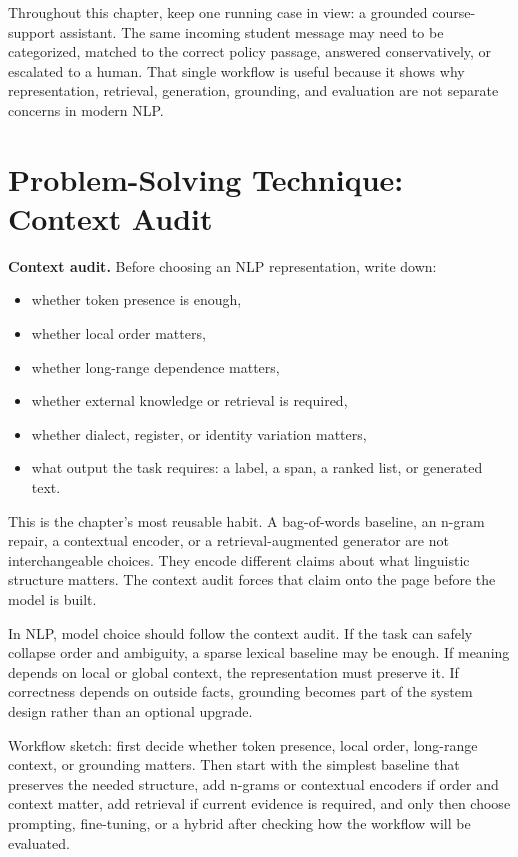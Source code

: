 Throughout this chapter, keep one running case in view: a grounded course-support assistant. The same incoming student message may need to be categorized, matched to the correct policy passage, answered conservatively, or escalated to a human. That single workflow is useful because it shows why representation, retrieval, generation, grounding, and evaluation are not separate concerns in modern NLP.

\section{Problem-Solving Technique: Context Audit}

\begin{thinkingtool}
\textbf{Context audit.} Before choosing an NLP representation, write down:
\begin{itemize}[leftmargin=*]
\item whether token presence is enough,
\item whether local order matters,
\item whether long-range dependence matters,
\item whether external knowledge or retrieval is required,
\item whether dialect, register, or identity variation matters,
\item what output the task requires: a label, a span, a ranked list, or generated text.
\end{itemize}
\end{thinkingtool}

This is the chapter's most reusable habit. A bag-of-words baseline, an n-gram repair, a contextual encoder, or a retrieval-augmented generator are not interchangeable choices. They encode different claims about what linguistic structure matters. The context audit forces that claim onto the page before the model is built.

\begin{decisionbox}
In NLP, model choice should follow the context audit. If the task can safely collapse order and ambiguity, a sparse lexical baseline may be enough. If meaning depends on local or global context, the representation must preserve it. If correctness depends on outside facts, grounding becomes part of the system design rather than an optional upgrade.
\end{decisionbox}

\begin{practicalnote}
Workflow sketch: first decide whether token presence, local order, long-range context, or grounding matters. Then start with the simplest baseline that preserves the needed structure, add n-grams or contextual encoders if order and context matter, add retrieval if current evidence is required, and only then choose prompting, fine-tuning, or a hybrid after checking how the workflow will be evaluated.
\end{practicalnote}

